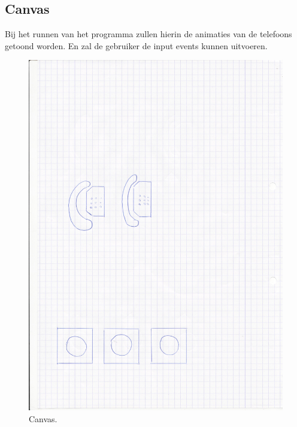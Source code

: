 \documentclass[]{article}
\begin{document}
\subsection{Canvas}
Bij het runnen van het programma zullen hierin de animaties van de telefoons getoond worden. En zal de gebruiker de input events kunnen uitvoeren.
\begin{figure}
  \centering
\includegraphics[scale=0.15]{mockups/canvas.jpg}
  \caption{Canvas.} \label{wire}
\end{figure} 


 
\end{document}
